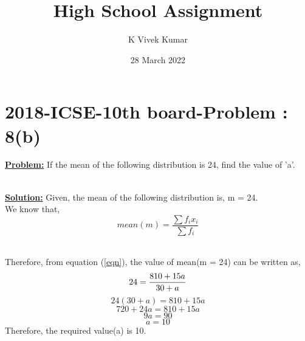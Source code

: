 \documentclass[12pt, a4paper, twocolumn]{article}
\title{High School Assignment}
\author{K Vivek Kumar}
\date{28 March 2022}
\begin{document}
\maketitle
\section{2018-ICSE-10th board-Problem : 8(b)}
\textbf{\underline{Problem:} }If the mean of the following distribution is 24, find the value of 'a'.
\begin{table}[htb]
\centering
{}
\end{table}\\
\textbf{\underline{Solution:} }Given, the mean of the following distribution is, m = 24.\\
We know that,
\begin{equation} \label{eqn}
mean(m) = \frac{\sum f_ix_i}{\sum f_i}
\end{equation}
\begin{table}[htb]
\centering
{}
\end{table}\\
Therefore, from equation (\ref{eqn}), the value of mean(m = 24) can be written as,\\
\begin{equation*}
24 = \frac{810 + 15a}{30 + a}\\
\end{equation*}
\begin{equation*}
24(30 + a) = 810 + 15a
\end{equation*}
\begin{equation*}
720 + 24a = 810 + 15a
\end{equation*}
\begin{equation*}
9a = 90
\end{equation*}
\begin{equation*}
a = 10
\end{equation*}
Therefore, the required value(a) is 10.
\end{document}
